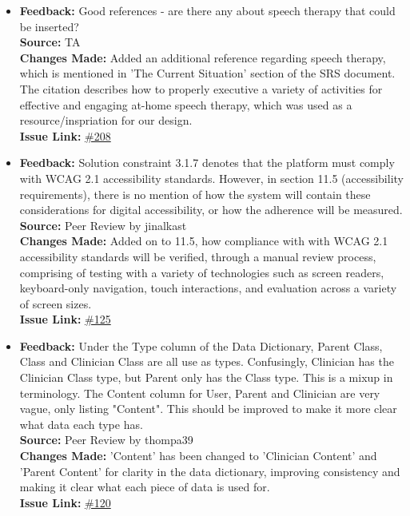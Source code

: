 \documentclass{article}
\begin{document}
\begin{itemize}
  \item 
    \textbf{Feedback:} Good references - are there any about speech therapy that could be inserted? \\
    \textbf{Source:} TA \\
    \textbf{Changes Made:} Added an additional reference regarding speech therapy, which is mentioned in 'The Current Situation' section of the SRS document. The citation describes how to properly executive a variety of activities for effective and engaging at-home speech therapy, which was used as a resource/inspriation for our design.\\
    \textbf{Issue Link:} \href{https://github.com/parishanizam/TeleHealth/issues/208}{\#208}

  \item 
    \textbf{Feedback:} Solution constraint 3.1.7 denotes that the platform must comply with WCAG 2.1 accessibility standards. However, in section 11.5 (accessibility requirements), there is no mention of how the system will contain these considerations for digital accessibility, or how the adherence will be measured. \\
    \textbf{Source:} Peer Review by jinalkast\\
    \textbf{Changes Made:} Added on to 11.5, how compliance with with WCAG 2.1 accessibility standards will be verified, through a manual review process, comprising of testing
    with a variety of technologies such as screen readers, keyboard-only navigation, touch interactions, and evaluation across a variety of screen sizes.\\
    \textbf{Issue Link:} \href{https://github.com/parishanizam/TeleHealth/issues/125}{\#125}

  \item 
    \textbf{Feedback:} Under the Type column of the Data Dictionary, Parent Class, Class and Clinician Class are all use as types. Confusingly, Clinician has the Clinician Class type, but Parent only has the Class type. This is a mixup in terminology.
    The Content column for User, Parent and Clinician are very vague, only listing "Content". This should be improved to make it more clear what data each type has. \\
    \textbf{Source:} Peer Review by thompa39\\
    \textbf{Changes Made:} 'Content' has been changed to 'Clinician Content' and 'Parent Content' for clarity in the data dictionary, improving consistency and making it clear what each piece of data is used for.\\
    \textbf{Issue Link:} \href{https://github.com/parishanizam/TeleHealth/issues/120}{\#120}


\end{itemize}
\end{document}
